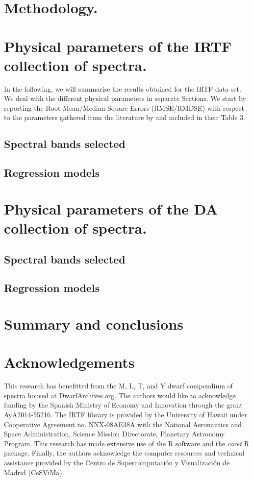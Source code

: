 \documentclass[a4paper,fleqn,usenatbib]{mnras}
\begin{document}
\section{Methodology.}
\label{sec:meth}


\section{Physical parameters of the IRTF collection of spectra.}
\label{sec:irtf}

In the following, we will summarise the results obtained for the IRTF
data set. We deal with the different physical parameters in separate
Sections. We start by reporting the Root Mean/Median Square Errors
(RMSE/RMDSE) with respect to the parameters gathered from the
literature by \cite{cesetti} and included in their Table 3.

\subsection{Spectral bands selected}

\subsection{Regression models}


\section{Physical parameters of the DA collection of spectra.}
\label{sec:ipac}

\subsection{Spectral bands selected}

\subsection{Regression models}


\section{Summary and conclusions}
\label{sec:summary}


\section*{Acknowledgements}
This research has benefitted from the M, L, T, and Y dwarf compendium
of spectra housed at DwarfArchives.org.  The authors would like to
acknowledge funding by the Spanish Ministry of Economy and Innovation
through the grant AyA2014-55216. The IRTF library is provided by the
University of Hawaii under Cooperative Agreement no. NNX-08AE38A with
the National Aeronautics and Space Administration, Science Mission
Directorate, Planetary Astronomy Program. This research has made
extensive use of the R software \cite{R} and the {\it caret} R
package. Finally, 
the authors acknowledge the computer resources and technical assistance 
provided by the Centro de Supercomputaci\'on y Visualizaci\'on de Madrid (CeSViMa).
\end{document}
